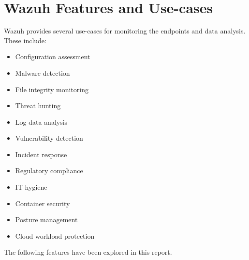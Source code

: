 \newpage
\section{Wazuh Features and Use-cases}

Wazuh provides several use-cases for monitoring the endpoints and data analysis. These include:
\begin{itemize}
    \item Configuration assessment
    \item Malware detection
    \item File integrity monitoring
    \item Threat hunting
    \item Log data analysis
    \item Vulnerability detection
    \item Incident response
    \item Regulatory compliance
    \item IT hygiene
    \item Container security
    \item Posture management
    \item Cloud workload protection
\end{itemize}

The following features have been explored in this report.


